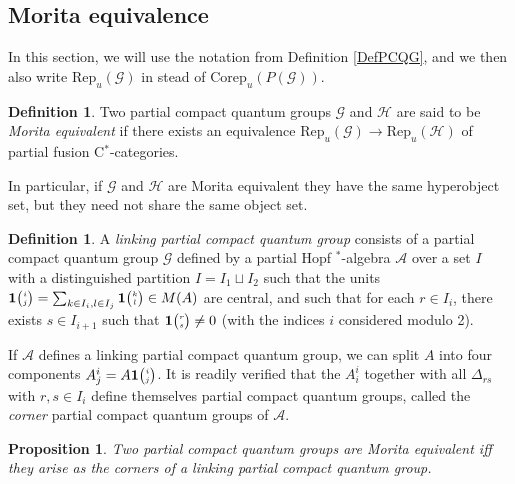 \documentclass[10pt]{article}
\newcommand{\Corep}{\mathrm{Corep}}
\newcommand{\Rep}{\mathrm{Rep}}
\newcommand{\Grt}[3]{#1{\tiny {\begin{pmatrix} #2\\#3\end{pmatrix}}}}
\newcommand{\UnitC}[2]{\Grt{\mathbf{1}}{#1}{#2}}
\newtheorem{Prop}[Theorem]{Proposition}
\theoremstyle{definition}
\newtheorem{Def}[Theorem]{Definition}
\numberwithin{equation}{section}
\begin{document}
\subsection{Morita equivalence}

In this section, we will use the notation from Definition \ref{DefPCQG}, and we then also write $\Rep_u(\mathscr{G})$ in stead of $\Corep_u(P(\mathscr{G}))$.


\begin{Def} Two partial compact quantum groups $\mathscr{G}$ and $\mathscr{H}$ are said to be \emph{Morita equivalent} if there exists an equivalence $\Rep_u(\mathscr{G}) \rightarrow \Rep_u(\mathscr{H})$ of partial fusion C$^*$-categories. 
\end{Def} 

In particular, if $\mathscr{G}$ and $\mathscr{H}$ are Morita equivalent they have the same hyperobject set, but they need not share the same object set.

\begin{Def} A \emph{linking partial compact quantum group} consists of a partial compact quantum group $\mathscr{G}$ defined by a partial Hopf $^*$-algebra $\mathscr{A}$ over a set $I$ with a distinguished partition $I = I_1\sqcup I_2$ such that the units $\UnitC{i}{j} = \sum_{k\in I_i,l\in I_j} \UnitC{k}{l} \in M(A)$ are central, and such that for each $r\in I_i$, there exists $s\in I_{i+1}$ such that $\UnitC{r}{s}\neq 0$ (with the indices $i$ considered modulo 2).
\end{Def}

If $\mathscr{A}$ defines a linking partial compact quantum group, we can split $A$ into four components $A^i_j = A\UnitC{i}{j}$. It is readily verified that the $A^i_i$ together with all $\Delta_{rs}$ with $r,s \in I_i$ define themselves partial compact quantum groups, called the \emph{corner} partial compact quantum groups of $\mathscr{A}$. 

\begin{Prop} Two partial compact quantum groups are Morita equivalent iff they arise as the corners of a linking partial compact quantum group.
\end{Prop}
\end{document}
